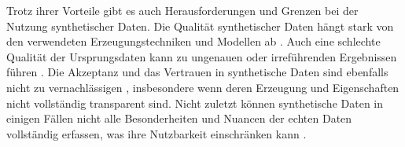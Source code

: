 \begin{spacing}{1.5}
Trotz ihrer Vorteile gibt es auch Herausforderungen und Grenzen bei der Nutzung synthetischer Daten. Die Qualität synthetischer Daten hängt stark von den verwendeten Erzeugungstechniken und Modellen ab \cite[60]{hradec_multipurpose_2022}. Auch eine schlechte Qualität der Ursprungsdaten kann zu ungenauen oder irreführenden Ergebnissen führen \cite[2]{selvarajoo_towards_2024}. Die Akzeptanz und das Vertrauen in synthetische Daten sind ebenfalls nicht zu vernachlässigen \cite{van_hoorn_acceptance_2024}, insbesondere wenn deren Erzeugung und Eigenschaften nicht vollständig transparent sind. Nicht zuletzt können synthetische Daten in einigen Fällen nicht alle Besonderheiten und Nuancen der echten Daten vollständig erfassen, was ihre Nutzbarkeit einschränken kann \cite[5]{hao_synthetic_2024}.

\end{spacing}
